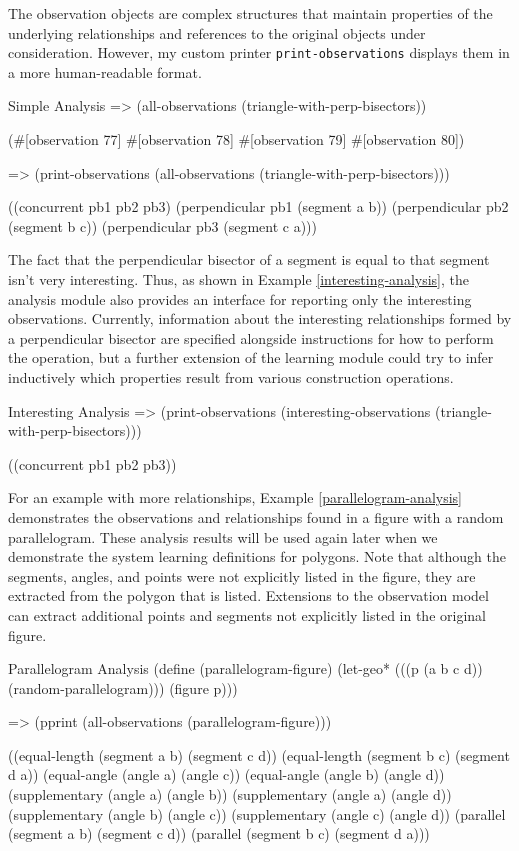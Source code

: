 The observation objects are complex structures that maintain
properties of the underlying relationships and references to the
original objects under consideration. However, my custom printer
\texttt{print-observations} displays them in a more
human-readable format.

\begin{repl-example}
[label=simple-analysis]
{Simple Analysis}
=> (all-observations (triangle-with-perp-bisectors))

(#[observation 77] #[observation 78] #[observation 79] #[observation 80])

=> (print-observations (all-observations (triangle-with-perp-bisectors)))

((concurrent pb1 pb2 pb3)
 (perpendicular pb1 (segment a b))
 (perpendicular pb2 (segment b c))
 (perpendicular pb3 (segment c a)))
\end{repl-example}

The fact that the perpendicular bisector of a segment is equal to that
segment isn't very interesting. Thus, as shown in Example
\ref{interesting-analysis}, the analysis module also provides an
interface for reporting only the interesting observations. Currently,
information about the interesting relationships formed by a
perpendicular bisector are specified alongside instructions for how to
perform the operation, but a further extension of the learning module
could try to infer inductively which properties result from various
construction operations.

\begin{repl-example}
[label=interesting-analysis]
{Interesting Analysis}
=> (print-observations (interesting-observations
                         (triangle-with-perp-bisectors)))

((concurrent pb1 pb2 pb3))
\end{repl-example}

For an example with more relationships, Example
\ref{parallelogram-analysis} demonstrates the observations and
relationships found in a figure with a random parallelogram. These
analysis results will be used again later when we demonstrate the
system learning definitions for polygons. Note that although the
segments, angles, and points were not explicitly listed in the figure,
they are extracted from the polygon that is listed. Extensions to the
observation model can extract additional points and segments not
explicitly listed in the original figure.

\begin{repl-example}
[label=parallelogram-analysis]
{Parallelogram Analysis}
(define (parallelogram-figure)
  (let-geo* (((p (a b c d)) (random-parallelogram)))
    (figure p)))

=> (pprint (all-observations (parallelogram-figure)))

((equal-length (segment a b) (segment c d))
 (equal-length (segment b c) (segment d a))
 (equal-angle (angle a) (angle c))
 (equal-angle (angle b) (angle d))
 (supplementary (angle a) (angle b))
 (supplementary (angle a) (angle d))
 (supplementary (angle b) (angle c))
 (supplementary (angle c) (angle d))
 (parallel (segment a b) (segment c d))
 (parallel (segment b c) (segment d a)))
\end{repl-example}

